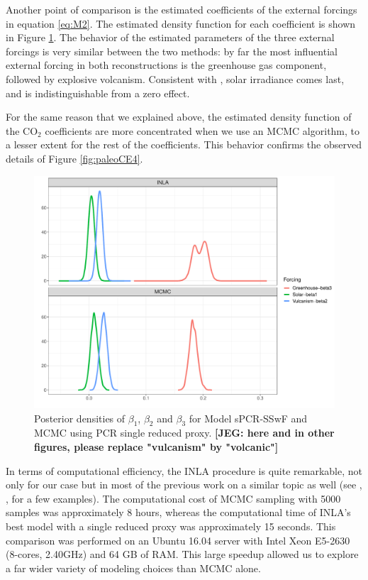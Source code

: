 \documentclass[12pt]{amsart}
\theoremstyle{plain}
\theoremstyle{definition}
\theoremstyle{remark}
\newcommand{\jeg}[1]{\color{ProcessBlue}\textbf{[JEG: #1]}\normalcolor}
\begin{document}
Another point of comparison is the estimated coefficients of the
external forcings in equation \eqref{eq:M2}. The estimated density function
for each coefficient is shown in Figure \ref{fig:betas}. The behavior of the
estimated parameters of the three external forcings is very similar between the
two methods: by far the most influential external forcing in
both reconstructions is the greenhouse gas component, followed by explosive volcanism. Consistent with \citet{Schurer2013b}, solar irradiance comes last, and is indistinguishable from a zero effect. 

For the same reason that we explained above, the estimated density
function of the CO$_2$ coefficients are more
concentrated when we use an MCMC algorithm, to a lesser extent for the rest of the
coefficients. This behavior confirms the observed details of Figure
\ref{fig:paleoCE4}. 

\begin{figure}
  \centering
  \includegraphics[scale=0.45]{PlotBetas}
  \caption{Posterior densities of $\beta_1$, $\beta_2$ and $\beta_3$ for Model
    sPCR-SSwF and MCMC using PCR single reduced proxy. \jeg{here and in other figures, please replace "vulcanism" by "volcanic"}}
  \label{fig:betas}
\end{figure}

In terms of computational efficiency, the INLA procedure is quite remarkable, not only
for our case but in most of the previous work on a similar topic as well (see \cite{Rue2009},
\cite{Blangiardo2013}, \cite{Ruiz-Cardenas2012} for a few examples). The
computational cost of MCMC sampling with 5000 samples was
approximately 8 hours, whereas the computational time of INLA's best model with
a single reduced proxy was approximately 15 seconds. This comparison
was performed on an Ubuntu 16.04 server with Intel Xeon E5-2630 (8-cores,
2.40GHz) and 64 GB of RAM.  This large speedup allowed us to explore a far wider variety of modeling choices than MCMC alone.
\end{document}
